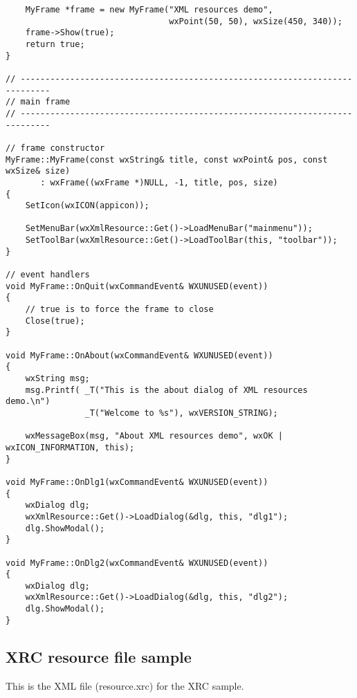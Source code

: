 \begin{verbatim}
    MyFrame *frame = new MyFrame("XML resources demo",
                                 wxPoint(50, 50), wxSize(450, 340));
    frame->Show(true);
    return true;
}

// ----------------------------------------------------------------------------
// main frame
// ----------------------------------------------------------------------------

// frame constructor
MyFrame::MyFrame(const wxString& title, const wxPoint& pos, const wxSize& size)
       : wxFrame((wxFrame *)NULL, -1, title, pos, size)
{
    SetIcon(wxICON(appicon));

    SetMenuBar(wxXmlResource::Get()->LoadMenuBar("mainmenu"));
    SetToolBar(wxXmlResource::Get()->LoadToolBar(this, "toolbar"));
}

// event handlers
void MyFrame::OnQuit(wxCommandEvent& WXUNUSED(event))
{
    // true is to force the frame to close
    Close(true);
}

void MyFrame::OnAbout(wxCommandEvent& WXUNUSED(event))
{
    wxString msg;
    msg.Printf( _T("This is the about dialog of XML resources demo.\n")
                _T("Welcome to %s"), wxVERSION_STRING);

    wxMessageBox(msg, "About XML resources demo", wxOK | wxICON_INFORMATION, this);
}

void MyFrame::OnDlg1(wxCommandEvent& WXUNUSED(event))
{
    wxDialog dlg;
    wxXmlResource::Get()->LoadDialog(&dlg, this, "dlg1");
    dlg.ShowModal();
}

void MyFrame::OnDlg2(wxCommandEvent& WXUNUSED(event))
{
    wxDialog dlg;
    wxXmlResource::Get()->LoadDialog(&dlg, this, "dlg2");
    dlg.ShowModal();
}
\end{verbatim}

\subsection{XRC resource file sample}\label{xrcsample}

This is the XML file (resource.xrc) for the XRC sample.


